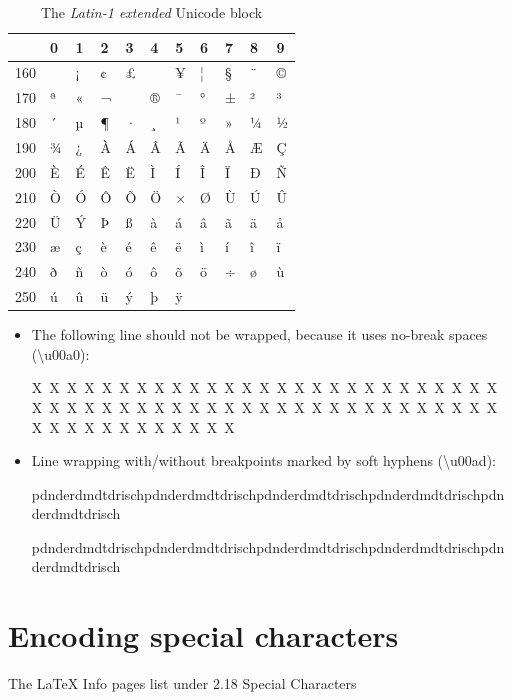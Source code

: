 \documentclass[a4paper]{article}
\providecommand*{\DUroletitlereference}[1]{\textsl{#1}}
\begin{document}
\begin{longtable}{|l|l|l|l|l|l|l|l|l|l|l|}
\caption{The \DUroletitlereference{Latin-1 extended} Unicode block}\\
\hline

% 
 & 0 & 1 & 2 & 3 & 4 & 5 & 6 & 7 & 8 & 9 \\
\hline
160 &  & ¡ & ¢ & £ &  & ¥ & ¦ & § & ¨ & © \\
\hline
170 & ª & « & ¬ & \- & ® & ¯ & ° & ± & ² & ³ \\
\hline
180 & ´ & µ & ¶ & · & ¸ & ¹ & º & » & ¼ & ½ \\
\hline
190 & ¾ & ¿ & À & Á & Â & Ã & Ä & Å & Æ & Ç \\
\hline
200 & È & É & Ê & Ë & Ì & Í & Î & Ï & Ð & Ñ \\
\hline
210 & Ò & Ó & Ô & Õ & Ö & × & Ø & Ù & Ú & Û \\
\hline
220 & Ü & Ý & Þ & ß & à & á & â & ã & ä & å \\
\hline
230 & æ & ç & è & é & ê & ë & ì & í & î & ï \\
\hline
240 & ð & ñ & ò & ó & ô & õ & ö & ÷ & ø & ù \\
\hline
250 & ú & û & ü & ý & þ & ÿ &  &  &  &  \\
\hline
\end{longtable}

\begin{itemize}
\item The following line should not be wrapped, because it uses
no-break spaces (\textbackslash{}u00a0):

X X X X X X X X X X X X X X X X X X X X X X X X X X X X X X X X X X X X X X X X X X X X X X X X X X X X X X X X X X X X X X X X X X

\item Line wrapping with/without breakpoints marked by soft hyphens
(\textbackslash{}u00ad):

pdn\-derd\-mdtd\-ri\-schpdn\-derd\-mdtd\-ri\-schpdn\-derd\-mdtd\-ri\-schpdn\-derd\-mdtd\-ri\-schpdn\-derd\-mdtd\-ri\-sch

pdnderdmdtdrischpdnderdmdtdrischpdnderdmdtdrischpdnderdmdtdrischpdnderdmdtdrisch
\end{itemize}


\section{Encoding special characters%
  \label{encoding-special-characters}%
}

The LaTeX Info pages list under \textquotedbl{}2.18 Special Characters\textquotedbl{}
\end{document}
